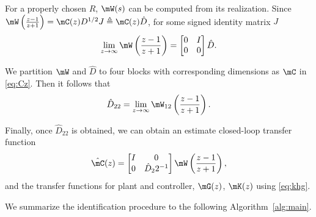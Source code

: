   For a properly chosen $R$, $\mW(s)$ can be computed from its realization. Since $\mW\left(\frac{z-1}{z+1}\right)=\mC(z)D^{1/2}J\triangleq \mC(z)\hat{D}$, for some signed identity matrix $J$ \cite{hayden}
  \begin{equation}
    \lim_{z\rightarrow\infty}\mW\left(\frac{z-1}{z+1}\right)=\begin{bmatrix} 0 & I \\
      0 & 0 
    \end{bmatrix} \hat{D}.
  \end{equation}

  We partition $\mW$ and $\hat{D}$ to four blocks with corresponding dimensions as $\mC$ in \eqref{eq:Cz}. Then it follows that 
  \begin{equation}\label{eq:D22}
    \hat{D}_{22}=\lim_{z\rightarrow\infty}\mW_{12}\left(\frac{z-1}{z+1}\right).
  \end{equation}

  Finally, once $\hat{D}_{22}$ is obtained, we can obtain an estimate closed-loop transfer function
  \begin{equation}
  \hat{\mC}(z) = \begin{bmatrix} 
    I & 0 \\ 
    0 & \hat{D}_22^{-1}
    \end{bmatrix} \mW \left(\frac{z-1}{z+1}\right),
  \end{equation}
  and the transfer functions for plant and controller, $\mG(z)$, $\mK(z)$ using \eqref{eq:khg}.

  We summarize the identification procedure to the following Algorithm~\ref{alg:main}. 

